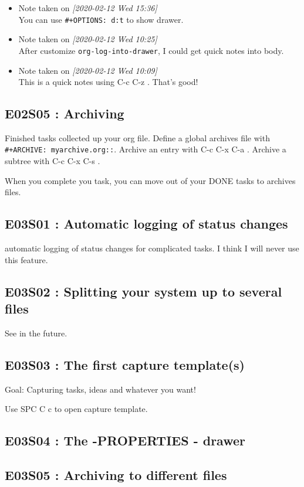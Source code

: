 \documentclass[11pt]{article}
\begin{document}
\begin{itemize}
\item Note taken on \textit{[2020-02-12 Wed 15:36] } \\
You can use \texttt{\#+OPTIONS: d:t} to show drawer.
\item Note taken on \textit{[2020-02-12 Wed 10:25] } \\
After customize \texttt{org-log-into-drawer}, I could get quick notes into body.
\item Note taken on \textit{[2020-02-12 Wed 10:09] } \\
This is a quick notes using  C-c C-z  . That's good!
\end{itemize}

\subsection{E02S05 : Archiving}
\label{sec:org2bb25e7}
Finished tasks collected up your org file. Define a global archives file with
\texttt{\#+ARCHIVE: myarchive.org::}. Archive an entry with  C-c C-x
C-a  . Archive a subtree with  C-c C-x C-s  .

When you complete you task, you can move out of your DONE tasks to archives files.

\subsection{E03S01 : Automatic logging of status changes}
\label{sec:org4b995cb}
automatic logging of status changes for complicated tasks. I think I will
never use this feature.
\subsection{E03S02 : Splitting your system up to several files}
\label{sec:org8205cae}
See in the future.
\subsection{E03S03 : The first capture template(s)}
\label{sec:orgb66d546}
Goal: Capturing tasks, ideas and whatever you want!

Use  SPC C c  to open capture template.
\subsection{E03S04 : The  -PROPERTIES - drawer}
\label{sec:orgd271664}
\subsection{E03S05 : Archiving to different files}
\label{sec:org3c5aba9}
\end{document}
